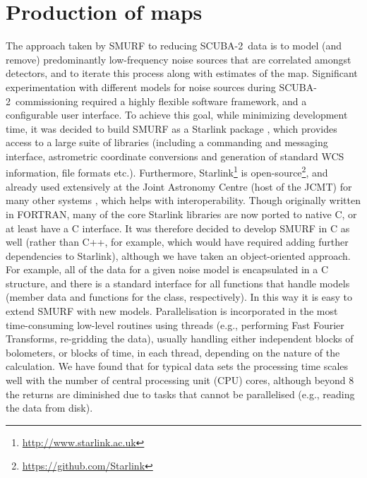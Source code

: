 \documentclass[useAMS,usenatbib,nofootinbib]{mn2e}
\newcommand{\scuba}{SCUBA-2}
\begin{document}
\section{Production of maps}
\label{sec:algorithm}

The approach taken by SMURF to reducing \scuba\ data is to model (and
remove) predominantly low-frequency noise sources that are correlated
amongst detectors, and to iterate this process along with estimates of
the map. Significant experimentation with different models for noise
sources during \scuba\ commissioning required a highly flexible
software framework, and a configurable user interface. To achieve this
goal, while minimizing development time, it was decided to build SMURF
as a Starlink package \citep{2009ASPC..411..418J}, which provides
access to a large suite of libraries (including a commanding and
messaging interface, astrometric coordinate conversions and generation
of standard WCS information, file formats etc.). Furthermore,
Starlink\footnote{\url{http://www.starlink.ac.uk}} is
open-source\footnote{\url{https://github.com/Starlink}}, and already
used extensively at the Joint Astronomy Centre (host of the JCMT) for
many other systems \citep{jenness2011}, which helps with
interoperability. Though originally written in FORTRAN, many of the
core Starlink libraries are now ported to native C, or at least have a
C interface. It was therefore decided to develop SMURF in C as well
(rather than C++, for example, which would have required adding
further dependencies to Starlink), although we have taken an
object-oriented approach. For example, all of the data for a given
noise model is encapsulated in a C structure, and there is a standard
interface for all functions that handle models (member data and
functions for the class, respectively). In this way it is easy to
extend SMURF with new models. Parallelisation is incorporated in the
most time-consuming low-level routines using threads (e.g., performing
Fast Fourier Transforms, re-gridding the data), usually handling
either independent blocks of bolometers, or blocks of time, in each
thread, depending on the nature of the calculation. We have found that
for typical data sets the processing time scales well with the number
of central processing unit (CPU) cores, although beyond 8 the returns
are diminished due to tasks that cannot be parallelised (e.g., reading
the data from disk).
\end{document}
